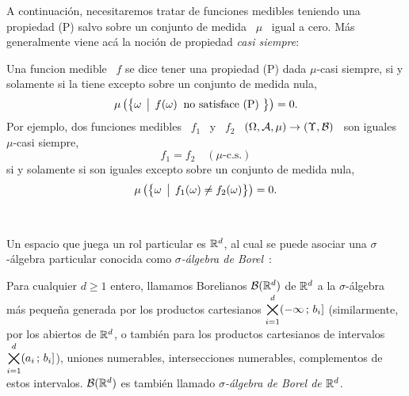 A  continuaci\'on,  necesitaremos  tratar  de funciones  medibles  teniendo  una
propiedad (P) salvo sobre  un conjunto de medida \ $\mu$ \  igual a cero.  M\'as
generalmente viene ac\'a la noci\'on de propiedad {\it casi siempre}:
%
\begin{definicion}
\label{Def:MP:CasiSiempre}
%
  Una funcion  medible \  $f$ se  dice tener una  propiedad (P)  dada $\mu$-casi
  siempre, si y solamente si la tiene excepto sobre un conjunto de medida nula,
  \[
  \mu\left( \left\{ \omega  \:\: \big| \:\: f(\omega) \: \mbox{ no  satisface (P) } \right\}
  \right) = 0.
  \]
  Por ejemplo, dos funciones medibles \ $f_1$ \ y \ $f_2$ \ $(\Omega,\mathcal{A},\mu) \to
  (\Upsilon,\mathcal{B})$ \ son iguales $\mu$-casi siempre,
  \[
  f_1 = f_2 \quad (\mu\mbox{-c.s.})
  \]
  si y solamente si son iguales excepto sobre un conjunto de medida nula,
  \[
  \mu\left( \left\{ \omega \:\: \big| \:\: f_1(\omega) \ne f_2(\omega) \right\} \right) = 0.
  \]
\end{definicion}

\

Un espacio  que juega un rol particular  es $\mathbb{R}^d$, al cual  se puede asociar
una  $\sigma$-\'algebra  particular  conocida  como {\it  $\sigma$-\'algebra  de
  Borel}~\cite{AthLah06, Bog07:v1, Bog07:v2, Coh13}:
%
\begin{definicion}
\label{Def:MP:Borelianos}
%
  Para  cualquier  $d  \ge  1$  entero,  llamamos  Borelianos  $\mathcal{B}(\mathbb{R}^d)$  de
  $\mathbb{R}^d$ a  la $\sigma$-\'algebra m\'as peque\~na generada  por los productos
  cartesianos     $\displaystyle    \operatorname*{\bigtimes}_{i=1}^d    (-\infty     \, ; \,    b_i]$
  \big(similarmente,  por  los  abiertos  de  $\mathbb{R}^d$, o  tambi\'en  para  los
  productos  cartesianos de intervalos  $\displaystyle \operatorname*{\bigtimes}_{i=1}^d  (a_i \, ; \,
  b_i]$\big), \ie uniones numerables, intersecciones numerables, complementos de
  estos intervalos.  $\mathcal{B}(\mathbb{R}^d)$  es tambi\'en llamado {\it $\sigma$-\'algebra
    de Borel de $\mathbb{R}^d$}.
\end{definicion}

\

